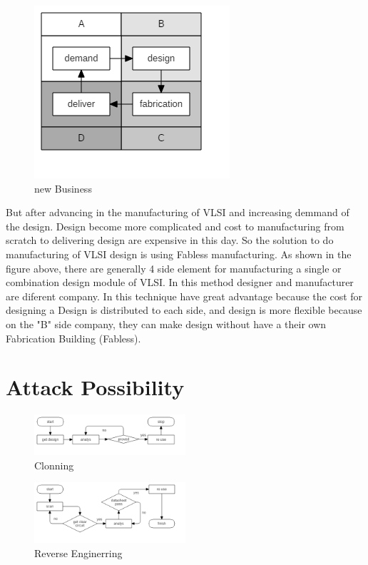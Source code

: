 \documentclass[10pt,journal,compsoc,letterpaper,final]{IEEEtran}
\begin{document}
\begin{figure}
	\centering
	\includegraphics[scale=0.5]{images/newBusinessLSI}
	\caption{new Business}
	\label{newb}
\end{figure}

But after advancing in the manufacturing of VLSI and increasing demmand of the design. Design become more complicated and cost to manufacturing from scratch to delivering design are expensive in this day. So the solution to do manufacturing of VLSI design is using Fabless manufacturing. As shown in the figure above, there are generally 4 side element for manufacturing a single or combination design module of VLSI. In this method designer and manufacturer are diferent company. In this technique have great advantage because the cost for designing a Design is distributed to each side, and design is more flexible because on the "B" side company, they can make design without have a their own Fabrication Building (Fabless).

\section{Attack Possibility}

\begin{figure}
	\centering
	\includegraphics[width=0.5\textwidth]
	{images/untrustSource.png}
	\caption{Clonning}
	\label{clonning}
\end{figure}

\begin{figure}
	\centering
	\includegraphics[width=0.5\textwidth]
	{images/reverseEngineering.png}
	\caption{Reverse Enginerring}
	\label{rever}
\end{figure}
\end{document}
